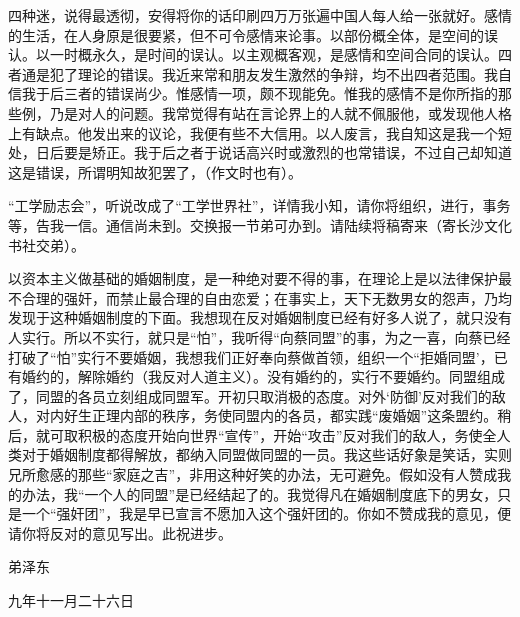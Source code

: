 四种迷，说得最透彻，安得将你的话印刷四万万张遍中国人每人给一张就好。感情的生活，在人身原是很要紧，但不可令感情来论事。以部份概全体，是空间的误认。以一时概永久，是时间的误认。以主观概客观，是感情和空间合同的误认。四者通是犯了理论的错误。我近来常和朋友发生激然的争辩，均不出四者范围。我自信我于后三者的错误尚少。惟感情一项，颇不现能免。惟我的感情不是你所指的那些例，乃是对人的问题。我常觉得有站在言论界上的人就不佩服他，或发现他人格上有缺点。他发出来的议论，我便有些不大信用。以人废言，我自知这是我一个短处，日后要是矫正。我于后之者于说话高兴时或激烈的也常错误，不过自己却知道这是错误，所谓明知故犯罢了，（作文时也有）。

“工学励志会”，听说改成了“工学世界社”，详情我小知，请你将组织，进行，事务等，告我一信。通信尚未到。交换报一节弟可办到。请陆续将稿寄来（寄长沙文化书社交弟）。

以资本主义做基础的婚姻制度，是一种绝对要不得的事，在理论上是以法律保护最不合理的强奸，而禁止最合理的自由恋爱；在事实上，天下无数男女的怨声，乃均发现于这种婚姻制度的下面。我想现在反对婚姻制度已经有好多人说了，就只没有人实行。所以不实行，就只是“怕”，我听得“向蔡同盟”的事，为之一喜，向蔡已经打破了“怕”实行不要婚姻，我想我们正好奉向蔡做首领，组织一个“拒婚同盟’，已有婚约的，解除婚约（我反对人道主义）。没有婚约的，实行不要婚约。同盟组成了，同盟的各员立刻组成同盟军。开初只取消极的态度。对外‘防御’反对我们的敌人，对内好生正理内部的秩序，务使同盟内的各员，都实践“废婚姻”这条盟约。稍后，就可取积极的态度开始向世界“宣传”，开始“攻击”反对我们的敌人，务使全人类对于婚姻制度都得解放，都纳入同盟做同盟的一员。我这些话好象是笑话，实则兄所愈感的那些“家庭之吉”，非用这种好笑的办法，无可避免。假如没有人赞成我的办法，我“一个人的同盟”是已经结起了的。我觉得凡在婚姻制度底下的男女，只是一个“强奸团”，我是早已宣言不愿加入这个强奸团的。你如不赞成我的意见，便请你将反对的意见写出。此祝进步。

 弟泽东

 九年十一月二十六日

